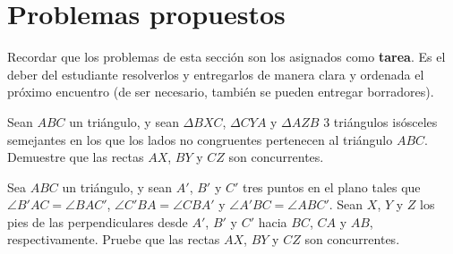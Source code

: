 \section{Problemas propuestos}

Recordar que los problemas de esta sección son los asignados como \textbf{tarea}.
Es el deber del estudiante resolverlos y entregarlos de manera clara y ordenada el próximo encuentro
(de ser necesario, también se pueden entregar borradores).

\begin{section-problem}
    Sean $ABC$ un triángulo, y sean $\Delta BXC$, $\Delta CYA$ y $\Delta AZB$ 3 triángulos isósceles semejantes en los que los lados no congruentes pertenecen al triángulo $ABC$.
    Demuestre que las rectas $AX$, $BY$ y $CZ$ son concurrentes.
\end{section-problem}

\begin{section-problem}
    Sea $ABC$ un triángulo, y sean $A'$, $B'$ y $C'$ tres puntos en el plano tales que $\angle B'AC = \angle BAC'$, $\angle C'BA = \angle CBA'$ y $\angle A'BC = \angle ABC'$.
    Sean $X$, $Y$ y $Z$ los pies de las perpendiculares desde $A'$, $B'$ y $C'$ hacia $BC$, $CA$ y $AB$, respectivamente.
    Pruebe que las rectas $AX$, $BY$ y $CZ$ son concurrentes.
\end{section-problem}